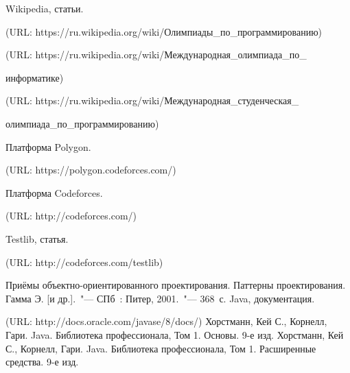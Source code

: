 \renewcommand{\bibname}{Список использованных источников}
\begin{thebibliography}{9}
 Wikipedia, статьи.\par
(URL: https://ru.wikipedia.org/wiki/Олимпиады\_по\_программированию)\par
(URL: https://ru.wikipedia.org/wiki/Международная\_олимпиада\_по\_\par информатике)\par
(URL: https://ru.wikipedia.org/wiki/Международная\_студенческая\_\par олимпиада\_по\_программированию)\par
{} Платформа Polygon.\par
(URL: https://polygon.codeforces.com/)\par
{} Платформа Codeforces.\par
(URL: http://codeforces.com/)\par
{} Testlib, статья.\par
(URL: http://codeforces.com/testlib)\par
{} Приёмы объектно-ориентированного проектирования. Паттерны проектирования. Гамма Э. [и др.].~"--- СПб~: Питер, 2001.~"--- 368~с.
 Java, документация.\par
(URL: http://docs.oracle.com/javase/8/docs/)
 Хорстманн, Кей С., Корнелл, Гари. Java. Библиотека профессионала, Том 1. Основы. 9-е изд.
 Хорстманн, Кей С., Корнелл, Гари. Java. Библиотека профессионала, Том 1. Расширенные средства. 9-е изд.
\end{thebibliography}